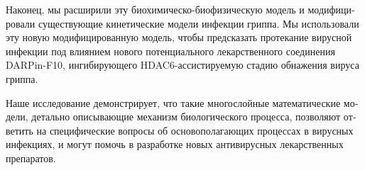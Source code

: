 \begin{otherlanguage}{russian}
Наконец, мы расширили эту биохимическо-биофизическую модель и модифицировали существующие кинетические модели инфекции гриппа. Мы использовали эту новую модифицированную модель, чтобы предсказать протекание вирусной инфекции под влиянием нового потенциального лекарственного соединения DARPin-F10, ингибирующего HDAC6-ассистируемую стадию обнажения вируса гриппа.

Наше исследование демонстрирует, что такие многослойные математические модели, детально описывающие механизм биологического процесса,  позволяют ответить на специфические вопросы об основополагающих процессах в вирусных инфекциях, и могут помочь в разработке новых антивирусных лекарственных препаратов.

\end{otherlanguage}


\endgroup

\vfill